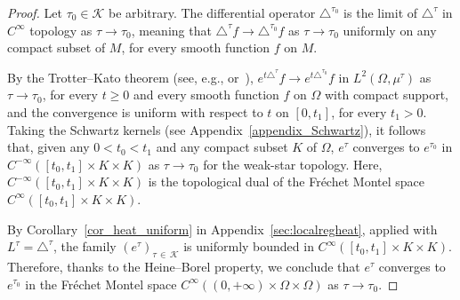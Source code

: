 \documentclass[AHL,Unicode,published]{cedram}
\newcommand{\calK}{\mathcal{K}}
\renewcommand{\geq}{\geqslant}
\begin{document}
\begin{proof}
Let $\tau_0\in\calK$ be arbitrary. The differential operator $\triangle^{\tau_0}$ is the limit of $\triangle^\tau$ in $C^\infty$ topology as $\tau\rightarrow\tau_0$, meaning that $\triangle^\tau f\rightarrow \triangle^{\tau_0} f$ as $\tau\rightarrow\tau_0$ uniformly on any compact subset of $M$, for every smooth function $f$ on $M$.

By the Trotter--Kato theorem (see, e.g., \cite[Chapter~III]{EngelNagel} or~\cite[Chapter~3]{Pazy}), $e^{t\triangle^\tau} f \rightarrow e^{t \triangle^{\tau_0}} f$ in $L^2(\Omega,\mu^\tau)$ as $\tau\rightarrow\tau_0$, for every $t\geq 0$ and every smooth function $f$ on $\Omega$ with compact support, and the convergence is uniform with respect to $t$ on $[0,t_1]$, for every $t_1>0$. Taking the Schwartz kernels (see Appendix~\ref{appendix_Schwartz}), it follows that, given any $0<t_0<t_1$ and any compact subset $K$ of $\Omega$, $e^\tau$ converges to $e^{\tau_0}$ in $C^{-\infty}([t_0,t_1]\times K\times K)$ as $\tau\rightarrow\tau_0$ for the weak-star topology. Here, $C^{-\infty}([t_0,t_1]\times K\times K)$ is the topological dual of the Fréchet Montel space $C^\infty([t_0,t_1]\times K\times K)$.

By Corollary~\ref{cor_heat_uniform} in Appendix~\ref{sec:localregheat}, applied with $L^\tau = \triangle^\tau$, the family $(e^\tau)_{\tau\,\in\,\calK}$ is uniformly bounded in $C^{\infty}([t_0,t_1]\times K\times K)$. Therefore, thanks to the Heine--Borel property, we conclude that $e^\tau$ converges to $e^{\tau_0}$ in the Fréchet Montel space $C^\infty((0,+\infty)\times\Omega\times\Omega)$ as $\tau\rightarrow\tau_0$.
\end{proof}
\end{document}
